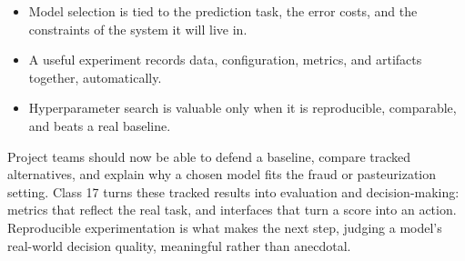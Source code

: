 \classclosingframe
{\begin{itemize}
\item Model selection is tied to the prediction task, the error costs, and the constraints of the system it will live in.
\item A useful experiment records data, configuration, metrics, and artifacts together, automatically.
\item Hyperparameter search is valuable only when it is reproducible, comparable, and beats a real baseline.
\end{itemize}}
{Project teams should now be able to defend a baseline, compare tracked alternatives, and explain why a chosen model fits the fraud or pasteurization setting.}
{Class 17 turns these tracked results into evaluation and decision-making: metrics that reflect the real task, and interfaces that turn a score into an action.}
{Reproducible experimentation is what makes the next step, judging a model's real-world decision quality, meaningful rather than anecdotal.}


